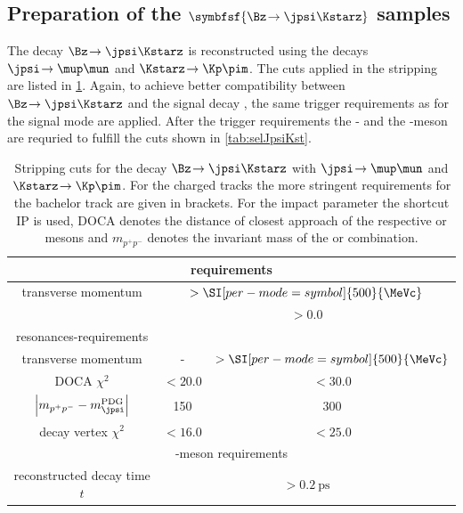 \subsection[head={Preparation of the $\Bz\!\to\jpsi\Kstarz$ samples},tocentry={Preparation of the $\Bz\!\to\jpsi\Kstarz$ samples}]{Preparation of the $\symbfsf{\Bz\!\to\jpsi\Kstarz}$ samples}
\label{sec:PrepBd2JpsiKstSample}


The decay $\Bz\!\to\jpsi\Kstarz$ is reconstructed using the decays $\jpsi\!\to\mup\mun$ and \mbox{$\Kstarz\!\to\Kp\pim$}.
The cuts applied in the stripping are listed in \cref{tab:JpsiKstStripping}.
Again, to achieve  better compatibility between $\Bz\!\to\jpsi\Kstarz$ and the signal decay \BdToDpi, the same trigger requirements as for the signal mode are applied.
After the trigger requirements the \Kstarz- and the \jpsi-meson are requried to fulfill the cuts shown in \cref{tab:selJpsiKst}.
\begin{table}[tbp]
	\centering
	\caption{Stripping cuts for the decay $\Bz\!\to\jpsi\Kstarz$ with $\jpsi\!\to\mup\mun$ and $\Kstarz\!\to\Kp\pim$.
	For the charged tracks the more stringent requirements for the bachelor track are given in brackets.
	For the impact parameter the shortcut IP is used, DOCA denotes the distance of closest approach of the respective \Kstarz or \jpsi mesons and $m_{p^+p^-}$ denotes the invariant mass of the \mup\mun or \Kp\pim combination.}
	\begin{tabular}{ccc}
		\toprule
		\multicolumn{3}{c}{\muon requirements}\\
		\midrule
		transverse momentum \pt 	& \multicolumn{2}{c}{$>\SI[per-mode=symbol]{500}{\MeVc}$} \\
		\dllmupi					& \multicolumn{2}{c}{$>0.0$} \\
		\midrule
		resonances-requirements & \jpsi & \Kstarz\\
		\midrule
		transverse momentum \pt 							& - 								& $>\SI[per-mode=symbol]{500}{\MeVc}$ \\
		DOCA $\chi^2$										& $<20.0$ 							& $<30.0$ \\
		$\left|m_{p^+p^-}-m_{\jpsi}^{\text{PDG}}\right|$	& \SI[per-mode=symbol]{150}{\MeVcc} & \SI[per-mode=symbol]{300}{\MeVcc} \\
		decay vertex $\chi^2$ 								& $<16.0$ 							& $<25.0$ \\
		\midrule
		\multicolumn{3}{c}{\Bz-meson requirements}\\
		\midrule
		reconstructed decay time $t$ 	& \multicolumn{2}{c}{$>\SI{0.2}{\pico\second}$} \\
		\bottomrule
	\end{tabular}
	\label{tab:JpsiKstStripping}
\end{table}
